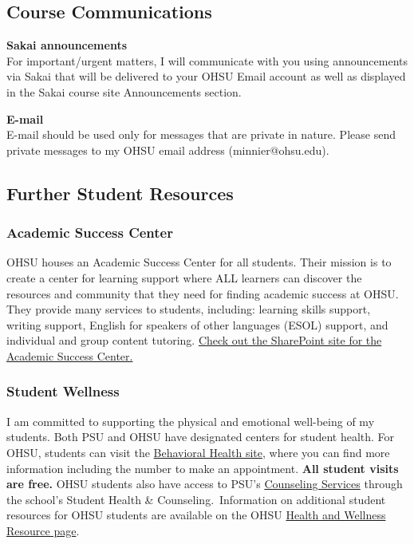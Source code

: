 \documentclass[
  letterpaper,
  DIV=11,
  numbers=noendperiod]{scrartcl}
\begin{document}
\subsection{Course Communications}\label{course-communications}

\textbf{Sakai announcements\\
}For important/urgent matters, I will communicate with you using
announcements via Sakai that will be delivered to your OHSU Email
account as well as displayed in the Sakai course site Announcements
section.

\textbf{E-mail}\\
E-mail should be used only for messages that are private in nature.
Please send private messages to my OHSU email address
(minnier@ohsu.edu).

\subsection{Further Student Resources}\label{further-student-resources}

\subsubsection{Academic Success Center}\label{academic-success-center}

OHSU houses an Academic Success Center for all students. Their mission
is to create a center for learning support where ALL learners can
discover the resources and community that they need for finding academic
success at OHSU. They provide many services to students, including:
learning skills support, writing support, English for speakers of other
languages (ESOL) support, and individual and group content tutoring.
\href{https://ohsuitg.sharepoint.com/sites/AcademicSuccessCenter}{Check
out the SharePoint site for the Academic Success Center.}

\subsubsection{Student Wellness}\label{student-wellness}

I am committed to supporting the physical and emotional well-being of my
students. Both PSU and OHSU have designated centers for student health.
For OHSU, students can visit the
\href{https://www.ohsu.edu/education/behavioral-health}{Behavioral
Health site}, where you can find more information including the number
to make an appointment. \textbf{All student visits are free.} OHSU
students also have access to PSU's
\href{https://www.pdx.edu/health-counseling/counseling}{Counseling
Services} through the school's Student Health \& Counseling.~Information
on additional student resources for OHSU students are available on the
OHSU \href{https://ohsu-psu-sph.org/health_and_wellness/}{Health and
Wellness Resource page}.~
\end{document}
